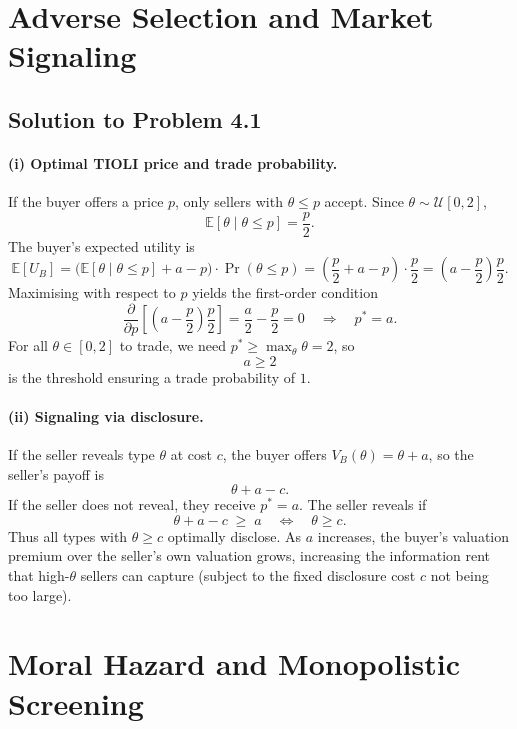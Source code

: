 \documentclass[12pt,a4paper]{article}
\begin{document}
\section{Adverse Selection and Market Signaling}

\subsection*{Solution to Problem 4.1}

\paragraph{(i) Optimal TIOLI price and trade probability.}
If the buyer offers a price \(p\), only sellers with \(\theta \leq p\) accept. Since \(\theta \sim \mathcal{U}[0,2]\),
\[
  \mathbb{E}[\theta \mid \theta \le p] = \frac{p}{2}.
\]
The buyer's expected utility is
\[
  \mathbb{E}[U_B]
  = \bigl(\mathbb{E}[\theta \mid \theta \le p] + a - p\bigr)\cdot \Pr(\theta \le p)
  = \left(\frac{p}{2} + a - p\right)\cdot \frac{p}{2}
  = \left(a - \frac{p}{2}\right)\frac{p}{2}.
\]
Maximising with respect to \(p\) yields the first-order condition
\[
  \frac{\partial}{\partial p}\left[\left(a - \frac{p}{2}\right)\frac{p}{2}\right]
  = \frac{a}{2} - \frac{p}{2} = 0
  \quad\Rightarrow\quad p^* = a.
\]
For all \(\theta \in [0,2]\) to trade, we need \(p^* \geq \max_{\theta}\theta = 2\), so
\[
  a \geq 2
\]
is the threshold ensuring a trade probability of \(1\).

\paragraph{(ii) Signaling via disclosure.}
If the seller reveals type \(\theta\) at cost \(c\), the buyer offers \(V_B(\theta) = \theta + a\), so the seller's payoff is
\[
  \theta + a - c.
\]
If the seller does not reveal, they receive \(p^* = a\). The seller reveals if
\[
  \theta + a - c \;\geq\; a
  \quad\Longleftrightarrow\quad
  \theta \geq c.
\]
Thus all types with \(\theta \geq c\) optimally disclose. As \(a\) increases, the buyer's valuation premium over the seller's own valuation grows, increasing the information rent that high-\(\theta\) sellers can capture (subject to the fixed disclosure cost \(c\) not being too large).

\section{Moral Hazard and Monopolistic Screening}
\end{document}
